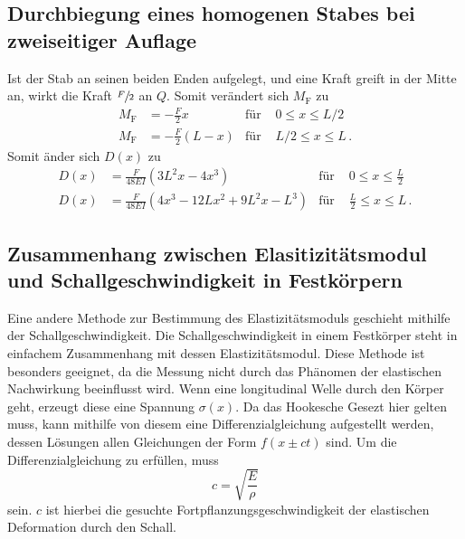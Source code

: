 \subsection{Durchbiegung eines homogenen Stabes bei zweiseitiger Auflage}
Ist der Stab an seinen beiden Enden aufgelegt, und eine Kraft greift in der Mitte an, wirkt die Kraft
$\sfrac{F}{2}$ an $Q$.
Somit verändert sich $M_\text{F}$ zu
\begin{align*}
    M_\text{F} & = - \frac{F}{2} x &\text{für} &\, \,0 \leq x \leq L/2 \\
    M_\text{F} & = - \frac{F}{2} (L -x) &\text{für} &\, \,L/2 \leq x \leq L \, .
\end{align*}
Somit änder sich $D(x)$ zu
\begin{align}
    D(x) & = \frac{F}{48EI}(3L^2x-4x^3) & \text{für} &\, \,0 \leq x \leq \frac{L}{2} \\
    D(x) & = \frac{F}{48EI}(4x^3- 12Lx^2+9L^2x-L^3) & \text{für} &\, \, \frac{L}{2} \leq x \leq L \, .
\end{align}

\subsection{Zusammenhang zwischen Elasitizitätsmodul und Schallgeschwindigkeit in Festkörpern}
Eine andere Methode zur Bestimmung des Elastizitätsmoduls geschieht mithilfe der Schallgeschwindigkeit.
Die Schallgeschwindigkeit in einem Festkörper steht in einfachem Zusammenhang mit dessen Elastizitätsmodul.
Diese Methode ist besonders geeignet, da die Messung nicht durch das Phänomen der elastischen Nachwirkung beeinflusst wird.
Wenn eine longitudinal Welle durch den Körper geht, erzeugt diese eine Spannung $\sigma (x)$.
Da das Hookesche Gesezt hier gelten muss, kann mithilfe von diesem eine Differenzialgleichung aufgestellt werden,
dessen Lösungen allen Gleichungen der Form $f(x \pm ct)$ sind.
Um die Differenzialgleichung zu erfüllen, muss
\begin{equation}
    c = \sqrt {\frac{E}{\rho}}
\end{equation}
sein.
$c$ ist hierbei die gesuchte Fortpflanzungsgeschwindigkeit der elastischen Deformation durch den Schall.
